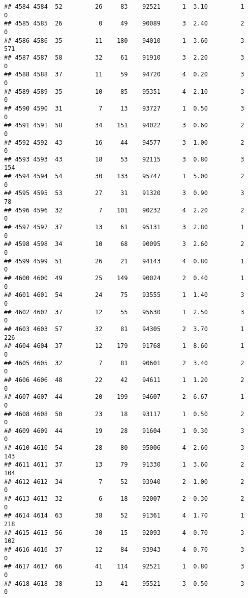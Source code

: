 \documentclass[
]{article}
\begin{document}
\begin{verbatim}
## 4584 4584  52         26     83    92521      1  3.10         1        0
## 4585 4585  26          0     49    90089      3  2.40         2        0
## 4586 4586  35         11    180    94010      1  3.60         3      571
## 4587 4587  58         32     61    91910      3  2.20         3        0
## 4588 4588  37         11     59    94720      4  0.20         3        0
## 4589 4589  35         10     85    95351      4  2.10         3        0
## 4590 4590  31          7     13    93727      1  0.50         3        0
## 4591 4591  58         34    151    94022      3  0.60         2        0
## 4592 4592  43         16     44    94577      3  1.00         2        0
## 4593 4593  43         18     53    92115      3  0.80         3      154
## 4594 4594  54         30    133    95747      1  5.00         2        0
## 4595 4595  53         27     31    91320      3  0.90         3       78
## 4596 4596  32          7    101    90232      4  2.20         2        0
## 4597 4597  37         13     61    95131      3  2.80         1        0
## 4598 4598  34         10     68    90095      3  2.60         2        0
## 4599 4599  51         26     21    94143      4  0.80         1        0
## 4600 4600  49         25    149    90024      2  0.40         1        0
## 4601 4601  54         24     75    93555      1  1.40         3        0
## 4602 4602  37         12     55    95630      1  2.50         3        0
## 4603 4603  57         32     81    94305      2  3.70         1      226
## 4604 4604  37         12    179    91768      1  8.60         1        0
## 4605 4605  32          7     81    90601      2  3.40         2        0
## 4606 4606  48         22     42    94611      1  1.20         2        0
## 4607 4607  44         20    199    94607      2  6.67         1        0
## 4608 4608  50         23     18    93117      1  0.50         2        0
## 4609 4609  44         19     28    91604      1  0.30         3        0
## 4610 4610  54         28     80    95006      4  2.60         3      143
## 4611 4611  37         13     79    91330      1  3.60         2      104
## 4612 4612  34          7     52    93940      2  1.00         2        0
## 4613 4613  32          6     18    92007      2  0.30         2        0
## 4614 4614  63         38     52    91361      4  1.70         1      218
## 4615 4615  56         30     15    92093      4  0.70         3      102
## 4616 4616  37         12     84    93943      4  0.70         3        0
## 4617 4617  66         41    114    92521      1  0.80         3        0
## 4618 4618  38         13     41    95521      3  0.50         3        0

\end{verbatim}
\end{document}

